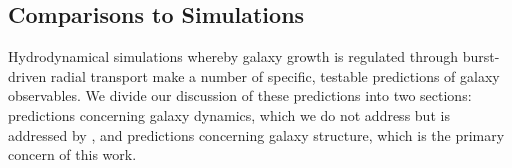 \documentclass[iop]{emulateapj}
\begin{document}


\subsection{Comparisons to Simulations}

Hydrodynamical simulations whereby galaxy growth is regulated through burst-driven radial transport make a number of specific, testable predictions of galaxy observables. We divide our discussion of these predictions into two sections: predictions concerning galaxy dynamics, which we do not address but is addressed by \cite{Cicone16}, and predictions concerning galaxy structure, which is the primary concern of this work.
\end{document}
